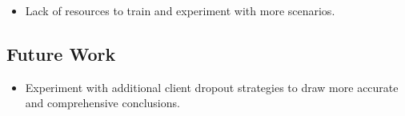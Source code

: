 \documentclass[12pt, a4paper]{article}
\begin{document}
\begin{itemize}
    \item Lack of resources to train and experiment with more scenarios.
\end{itemize}


\subsection{Future Work}

\begin{itemize}
    \item Experiment with additional client dropout strategies to draw more accurate and comprehensive conclusions.
\end{itemize}









\end{document}
